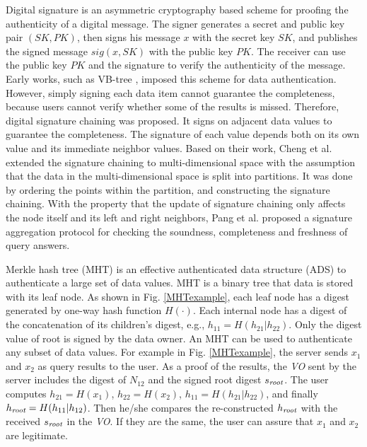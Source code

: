 \documentclass[10pt, conference, compsocconf]{IEEEtran}
\begin{document}
Digital signature is an asymmetric cryptography based scheme for proofing the authenticity of a digital message. The signer generates a secret and public key pair $(SK, PK)$, then signs his message $x$ with the secret key $SK$, and publishes the signed message $sig(x,SK)$ with the public key $PK$. The receiver can use the public key $PK$ and the signature to verify the authenticity of the message. Early works, such as VB-tree \cite{ICDE2004}, imposed this scheme for data authentication. However, simply signing each data item cannot guarantee the completeness, because users cannot verify whether some of the results is missed. Therefore, digital signature chaining \cite{SIGMOD2005} was proposed. It signs on adjacent data values to guarantee the completeness. The signature of each value depends both on its own value and its immediate neighbor values. Based on their work, Cheng et al. \cite{DBSEC2006} extended the signature chaining to multi-dimensional space with the assumption that the data in the multi-dimensional space is split into partitions. It was done by ordering the points within the partition, and constructing the signature chaining. With the property that the update of signature chaining only affects the node itself and its left and right neighbors, Pang et al. \cite{VLDB2009} proposed a signature aggregation protocol for checking the soundness, completeness and freshness of query answers.

Merkle hash tree (MHT) \cite{CRYPTO1989} is an effective authenticated data structure (ADS) to authenticate a large set of data values. MHT is a binary tree that data is stored with its leaf node. As shown in Fig. \ref{MHTexample}, each leaf node has a digest generated by one-way hash function $H(\cdot)$. Each internal node has a digest of the concatenation of its children's digest, e.g., $h_{11}=H(h_{21}|h_{22})$. Only the digest value of root is signed by the data owner. An MHT can be used to authenticate any subset of data values. For example in Fig. \ref{MHTexample}, the server sends $x_1$ and $x_2$ as query results to the user. As a proof of the results, the \emph{VO} sent by the server includes the digest of $N_{12}$ and the signed root digest $s_{\emph{root}}$. The user computes $h_{21}=H(x_1)$, $h_{22}=H(x_2)$, $h_{11}=H(h_{21}|h_{22})$, and finally $h_{\emph{root}}=H(h_{11}|h_{12})$. Then he/she compares the re-constructed $h_{\emph{root}}$ with the received $s_{\emph{root}}$ in the \emph{VO}. If they are the same, the user can assure that $x_1$ and $x_2$ are legitimate.
\end{document}
